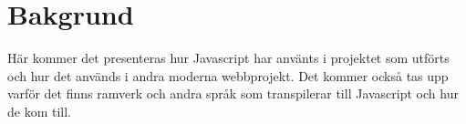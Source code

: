 \section{Bakgrund}
\label{sec:alexander-background}

Här kommer det presenteras hur Javascript har använts i projektet som utförts och hur det används i andra moderna webbprojekt. Det kommer också tas upp varför det finns ramverk och andra språk som transpilerar till Javascript och hur de kom till.